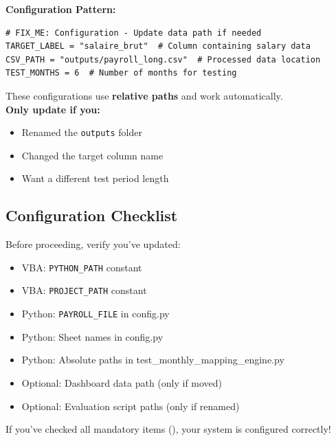 \documentclass[11pt,a4paper]{article}
\begin{document}
\textbf{Configuration Pattern:}

\begin{lstlisting}[style=pythonstyle, caption=Standard Evaluation Configuration]
# FIX_ME: Configuration - Update data path if needed
TARGET_LABEL = "salaire_brut"  # Column containing salary data
CSV_PATH = "outputs/payroll_long.csv"  # Processed data location
TEST_MONTHS = 6  # Number of months for testing
\end{lstlisting}

\begin{infobox}[title=When to Change These]
These configurations use \textbf{relative paths} and work automatically.\\[0.2cm]
\textbf{Only update if you:}
\begin{itemize}
    \item Renamed the \texttt{outputs} folder
    \item Changed the target column name
    \item Want a different test period length
\end{itemize}
\end{infobox}

\subsection{Configuration Checklist}

Before proceeding, verify you've updated:

\begin{itemize}[label=\faSquare]
    \item[\faCheckSquare] VBA: \texttt{PYTHON\_PATH} constant
    \item[\faCheckSquare] VBA: \texttt{PROJECT\_PATH} constant
    \item[\faCheckSquare] Python: \texttt{PAYROLL\_FILE} in config.py
    \item[\faCheckSquare] Python: Sheet names in config.py
    \item[\faCheckSquare] Python: Absolute paths in test\_monthly\_mapping\_engine.py
    \item[\faSquare] Optional: Dashboard data path (only if moved)
    \item[\faSquare] Optional: Evaluation script paths (only if renamed)
\end{itemize}

\begin{successbox}[title=Configuration Complete]
If you've checked all mandatory items (\faCheckSquare), your system is configured correctly!
\end{successbox}
\end{document}
